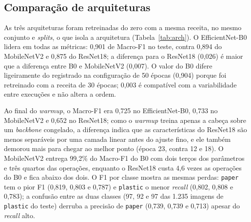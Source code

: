 \documentclass[11pt,a4paper]{article}
\begin{document}
	\subsection{Comparação de arquiteturas}
	
	As três arquiteturas foram retreinadas do zero com a mesma receita, no mesmo conjunto e \emph{splits}, o que isola a arquitetura (Tabela~\ref{tab:arch}). O EfficientNet-B0 lidera em todas as métricas: 0,901 de Macro-F1 no teste, contra 0,894 do MobileNetV2 e 0,875 do ResNet18; a diferença para o ResNet18 (0,026) é maior que a diferença entre B0 e MobileNetV2 (0,007). O valor do B0 difere ligeiramente do registrado na configuração de 50 épocas (0,904) porque foi retreinado com a receita de 30 épocas; 0,003 é compatível com a variabilidade entre execuções e não altera a ordem.
	
	\begin{table}[htbp]
		\centering
		\footnotesize
		\caption{Desempenho das três arquiteturas no teste do conjunto combinado (4.212 imagens, 30 épocas de treino).}
		\label{tab:arch}
	\end{table}
	
	Ao final do \emph{warmup}, o Macro-F1 era 0,725 no EfficientNet-B0, 0,733 no MobileNetV2 e 0,652 no ResNet18; como o \emph{warmup} treina apenas a cabeça sobre um \textit{backbone} congelado, a diferença indica que as características do ResNet18 são menos separáveis por uma camada linear antes do ajuste fino, e ele também demorou mais para chegar ao melhor ponto (época 23, contra 12 e 18). O MobileNetV2 entrega 99,2\% do Macro-F1 do B0 com dois terços dos parâmetros e três quartos das operações, enquanto o ResNet18 custa 4,6 vezes as operações do B0 e fica abaixo dos dois. O F1 por classe mostra as mesmas perdas: \texttt{paper} tem o pior F1 (0,819, 0,803 e 0,787) e \texttt{plastic} o menor \emph{recall} (0,802, 0,808 e 0,783); a confusão entre as duas classes (97, 92 e 97 das 1.235 imagens de \texttt{plastic} do teste) derruba a precisão de \texttt{paper} (0,739, 0,739 e 0,713) apesar do \emph{recall} alto.
	
\end{document}
